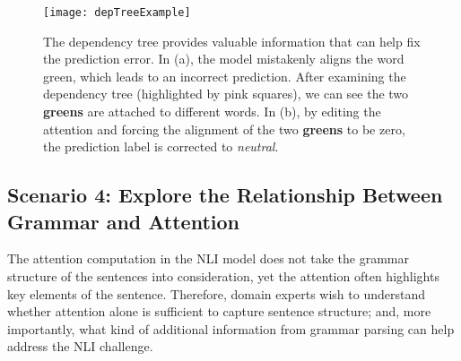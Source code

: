 
%
\begin{figure*}[t]
\centering
\vspace{-2mm}
 \texttt{[image: depTreeExample]}
  \vspace{-6mm}
 \caption{
The dependency tree provides valuable information that can help fix the prediction error.
In (a), the model mistakenly aligns the word green, which leads to an incorrect prediction.
After examining the dependency tree (highlighted by pink squares), we can see the two \textbf{greens} are attached to different words.
In (b), by editing the attention and forcing the alignment of the two \textbf{greens} to be zero, the prediction label is corrected to \emph{neutral}.
 }
\label{fig:depTreeExample}
 \vspace{-4mm}
\end{figure*}

\subsection{Scenario 4: Explore the Relationship Between Grammar and Attention}
\label{sec:grammarAttention}
The attention computation in the NLI model does not take the grammar structure of the sentences into consideration,
yet the attention often highlights key elements of the sentence.
Therefore, domain experts wish to understand whether attention alone is sufficient to capture sentence structure;
and, more importantly, what kind of additional information from grammar parsing can help address the NLI challenge.

